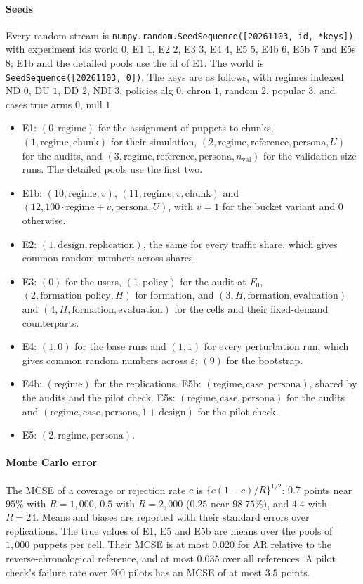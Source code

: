 \paragraph{Seeds} Every random stream is \texttt{numpy.random.SeedSequence([20261103, id, *keys])}, with experiment ids world $0$, E1 $1$, E2 $2$, E3 $3$, E4 $4$, E5 $5$, E4b $6$, E5b $7$ and E5s $8$; E1b and the detailed pools use the id of E1. The world is \texttt{SeedSequence([20261103, 0])}. The keys are as follows, with regimes indexed ND $0$, DU $1$, DD $2$, NDI $3$, policies alg $0$, chron $1$, random $2$, popular $3$, and cases true arms $0$, null $1$.
\begin{itemize}
  \item E1: $(0,\text{regime})$ for the assignment of puppets to chunks, $(1,\text{regime},\text{chunk})$ for their simulation, $(2,\text{regime},\text{reference},\text{persona},U)$ for the audits, and $(3,\text{regime},\text{reference},\text{persona},n_{\mathrm{val}})$ for the validation-size runs. The detailed pools use the first two.
  \item E1b: $(10,\text{regime},v)$, $(11,\text{regime},v,\text{chunk})$ and $(12,100\cdot\text{regime}+v,\text{persona},U)$, with $v=1$ for the bucket variant and $0$ otherwise.
  \item E2: $(1,\text{design},\text{replication})$, the same for every traffic share, which gives common random numbers across shares.
  \item E3: $(0)$ for the users, $(1,\text{policy})$ for the audit at $F_0$, $(2,\text{formation policy},H)$ for formation, and $(3,H,\text{formation},\text{evaluation})$ and $(4,H,\text{formation},\text{evaluation})$ for the cells and their fixed-demand counterparts.
  \item E4: $(1,0)$ for the base runs and $(1,1)$ for every perturbation run, which gives common random numbers across $\varepsilon$; $(9)$ for the bootstrap.
  \item E4b: $(\text{regime})$ for the replications. E5b: $(\text{regime},\text{case},\text{persona})$, shared by the audits and the pilot check. E5s: $(\text{regime},\text{case},\text{persona})$ for the audits and $(\text{regime},\text{case},\text{persona},1+\text{design})$ for the pilot check.
  \item E5: $(2,\text{regime},\text{persona})$.
\end{itemize}

\paragraph{Monte Carlo error} The MCSE of a coverage or rejection rate $c$ is $\{c(1-c)/R\}^{1/2}$: $0.7$ points near $95\%$ with $R=1{,}000$, $0.5$ with $R=2{,}000$ ($0.25$ near $98.75\%$), and $4.4$ with $R=24$. Means and biases are reported with their standard errors over replications. The true values of E1, E5 and E5b are means over the pools of $1{,}000$ puppets per cell. Their MCSE is at most $0.020$ for $\mathrm{AR}$ relative to the reverse-chronological reference, and at most $0.035$ over all references. A pilot check's failure rate over $200$ pilots has an MCSE of at most $3.5$ points.

